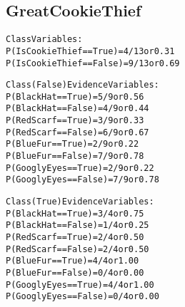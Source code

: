 \documentclass{article}
\begin{document}
  \subsection{GreatCookieThief}
  \begin{alltt}
Class Variables:
  P(IsCookieThief == True)  = 4/13 or 0.31
  P(IsCookieThief == False)   = 9/13 or 0.69

Class(False) Evidence Variables:
  P(BlackHat == True)   = 5/9 or 0.56
  P(BlackHat == False)  = 4/9 or 0.44
  P(RedScarf == True)   = 3/9 or 0.33
  P(RedScarf == False)  = 6/9 or 0.67
  P(BlueFur == True)  = 2/9 or 0.22
  P(BlueFur == False)   = 7/9 or 0.78
  P(GooglyEyes == True)   = 2/9 or 0.22
  P(GooglyEyes == False)  = 7/9 or 0.78

Class(True) Evidence Variables:
  P(BlackHat == True)   = 3/4 or 0.75
  P(BlackHat == False)  = 1/4 or 0.25
  P(RedScarf == True)   = 2/4 or 0.50
  P(RedScarf == False)  = 2/4 or 0.50
  P(BlueFur == True)  = 4/4 or 1.00
  P(BlueFur == False)   = 0/4 or 0.00
  P(GooglyEyes == True)   = 4/4 or 1.00
  P(GooglyEyes == False)  = 0/4 or 0.00
  \end{alltt}
\end{document}
